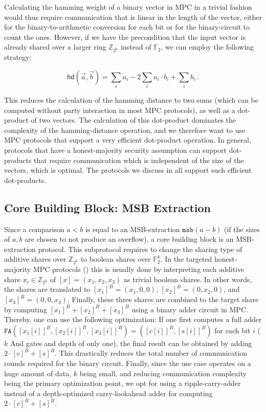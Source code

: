 \documentclass[a4paper,11pt,
]{article}
\newcommand{\F}{\ensuremath{\mathbb{F}}\xspace}
\newcommand{\Z}{\ensuremath{\mathbb{Z}}\xspace}
\newcommand{\shared}[1]{\ensuremath{[{#1}]}}
\newcommand{\sharedB}[1]{\ensuremath{[{#1}]^B}}
\begin{document}
Calculating the hamming weight of a binary vector in MPC in a trivial fashion would thus require communication that is linear in the length of the vector, either for the binary-to-arithmetic conversion for each bit or for the binary-circuit to count the ones. However, if we have the precondition that the input vector is already shared over a larger ring $\Z_{2^k}$ instead of $\F_2$, we can employ the following strategy:

\[
    \mathsf{hd}(\vec{a}, \vec{b}) = \sum_i a_i - 2\sum_i a_i \cdot b_i + \sum_i b_i\,.
\]

This reduces the calculation of the hamming distance to two sums (which can be computed without party interaction in most MPC protocols), as well as a dot-product of two vectors.
The calculation of this dot-product dominates the complexity of the hamming-distance operation, and we therefore want to use MPC protocols that support a very efficient dot-product operation.
In general, protocols that have a honest-majority security assumption can support dot-products that require communication which is independent of the size of the vectors, which is optimal.
The protocols we discuss in  all support such efficient dot-products.

\subsection{Core Building Block: MSB Extraction} \label{sec:a2b}

Since a comparison $a < b$ is equal to an MSB-extraction $\texttt{msb}(a-b)$ (if the sizes of $a,b$ are chosen to not produce an overflow), a core building block is an MSB-extraction protocol. This subprotocol requires to change the sharing type of additive shares over $\Z_{2^k}$ to boolean shares over $\F_2^k$. In the targeted honest-majority MPC protocols () this is usually done by interpreting each additive share $x_i \in \Z_{2^k}$ of $\shared{x}=(x_1, x_2, x_3)$ as trivial boolean shares. In other words, the shares are translated to $\sharedB{x_1} = (x_1, 0, 0)$, $\sharedB{x_2} = (0, x_2, 0)$, and $\sharedB{x_3} = (0, 0, x_3)$. Finally, these three shares are  combined to the target share by computing $\sharedB{x_1} + \sharedB{x_2} + \sharedB{x_3}$ using a binary adder circuit in MPC. Thereby, one can use the following optimization: If one first computes a full adder $\texttt{FA}(\sharedB{x_1[i]}, \sharedB{x_2[i]}, \sharedB{x_3[i]}) = (\sharedB{c[i]}, \sharedB{s[i]})$ for each bit $i$ ($k$ And gates and depth of only one), the final result can be obtained by adding $2 \cdot \sharedB{c} + \sharedB{s}$. This drastically reduces the total number of communication rounds required for the binary circuit.
Finally, since the use case operates on a huge amount of data, $k$ being small, and reducing communication complexity being the primary optimization point, we opt for using a ripple-carry-adder instead of a depth-optimized carry-lookahead adder for computing $2 \cdot \sharedB{c} + \sharedB{s}$.
\end{document}
